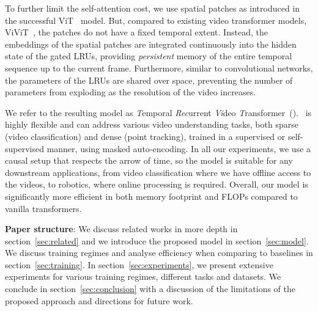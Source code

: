 To further limit the self-attention cost, we use spatial patches  as introduced in the successful ViT~\citep{dosovitskiy2021an} model. But, compared to existing video transformer models, \eg ViViT~\citep{vivit}, the patches do not have a fixed temporal extent. Instead, the embeddings of the spatial patches are integrated continuously into the hidden state of the gated LRUs, providing \emph{persistent} memory of 
the entire temporal sequence up to the current frame. Furthermore, similar to convolutional networks, the parameters of the LRUs are shared over space, preventing the number of parameters from exploding as the resolution of the video increases. 

We refer to the resulting model as \emph{T}emporal \emph{Rec}urrent \emph{Vi}deo \emph{T}ransformer~(\ssm).  \ssm\ is highly flexible and can address various video understanding tasks, both sparse (\eg video classification) and dense (\eg point tracking), trained in a supervised or self-supervised manner, \eg using masked auto-encoding. In all our experiments, we use a causal setup that respects the arrow of time, so the model is suitable for any downstream applications, from \eg video classification where we have offline access to the videos, to \eg robotics, where online processing is required. Overall, our model is significantly more efficient in both memory footprint and FLOPs compared to vanilla transformers.   

\par \noindent \textbf{Paper structure}: We discuss related works in more depth in section~\ref{sec:related} and we introduce the proposed model in section~\ref{sec:model}. We discuss training regimes and analyse efficiency when comparing to baselines in section~\ref{sec:training}. In section~\ref{sec:experiments}, we present extensive experiments for various training regimes, different tasks and datasets. We conclude in section~\ref{sec:conclusion} with a discussion of the limitations of the proposed approach and directions for future work.  
